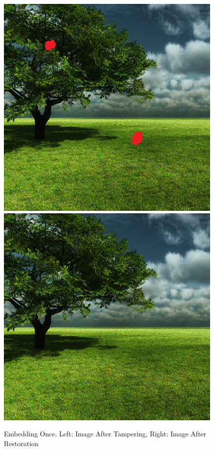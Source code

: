 \documentclass[12pt]{article}
\begin{document}
\begin{figure}[h]
\centerline{%
\includegraphics[scale=0.45]{"Tree Embed once 0.8 threshold/finalImage - Copy"}%
\hspace{0.1cm}
\includegraphics[scale=0.45]{"Tree Embed once 0.8 threshold/finalImageAfterRestoration"}%
}%
\caption{Embedding Once. Left: Image After Tampering, Right: Image After Restoration}
\label{fig:treeEmbedOnceRestoration}
\end{figure}
\end{document}
